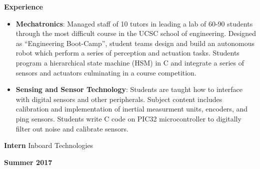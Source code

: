 \documentclass[paper=a4,fontsize=11pt]{article} %
\def \subSectionSpace   {0.25cm}    %
\def \leftColSpace      {0.1}       %
\def \middleColSpace    {0.71}      %
\def \bigMiddleColSpace {0.8}       %
\def \rightColSpace     {0.25}      %
\begin{document}
    \noindent
    \begin{minipage}[t]{\leftColSpace\linewidth}
        \noindent \textbf{Experience}
    \end{minipage}
    \begin{minipage}[t]{\bigMiddleColSpace\linewidth}
        \begin{itemize}[noitemsep,topsep=0pt]
            \item \textbf{Mechatronics}: Managed staff of 10 tutors in leading a lab of 60-90 students through the most difficult course in the UCSC school of engineering. Designed as “Engineering Boot-Camp”, student teams design and build an autonomous robot which perform a series of perception and actuation tasks. Students program a hierarchical state machine (HSM) in C and integrate a series of sensors and actuators culminating in a course competition.
            \vspace{\subSectionSpace}
            \item \textbf{Sensing and Sensor Technology}: Students are taught how to interface with digital sensors and other peripherals. Subject content includes calibration and implementation of inertial measurment units, encoders, and ping sensors. Students write C code on PIC32 microcontroller to digitally filter out noise and calibrate sensors.
        \end{itemize}
    \end{minipage}

    \vspace{\subSectionSpace}  
    \noindent
    \begin{minipage}[t]{\leftColSpace\linewidth}
        \hfill
    \end{minipage}
    \begin{minipage}[t]{\middleColSpace\linewidth}
        \noindent \textbf{Intern} \quad Inboard Technologies
    \end{minipage}
    \begin{minipage}[t]{\rightColSpace\linewidth}
        \begin{flushleft}
            \noindent \textbf{Summer 2017}
        \end{flushleft}
    \end{minipage}
\end{document}
